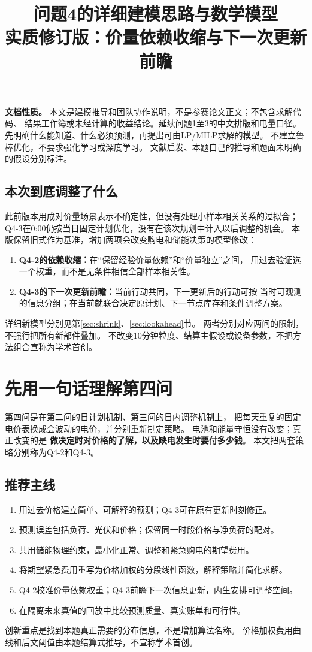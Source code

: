 \documentclass[UTF8,11pt]{ctexart}
\title{问题4的详细建模思路与数学模型\\
{\large 实质修订版：价量依赖收缩与下一次更新前瞻}}
\author{}
\date{}
\begin{document}
\maketitle

\noindent\textbf{文档性质。}
本文是建模推导和团队协作说明，不是参赛论文正文；不包含求解代码、
结果工作簿或未经计算的收益结论。延续问题1至3的中文排版和电量口径。
先明确什么能知道、什么必须预测，再提出可由LP/MILP求解的模型。
不建立鲁棒优化，不要求强化学习或深度学习。
文献启发、本题自己的推导和题面未明确的假设分别标注。

\subsection*{本次到底调整了什么}
此前版本用成对价量场景表示不确定性，但没有处理小样本相关关系的过拟合；
Q4-3在0:00仍按当日固定计划优化，没有在该次规划中计入以后调整的机会。
本版保留旧式作为基准，增加两项会改变购电和储能决策的模型修改：
\begin{enumerate}
 \item \textbf{Q4-2的依赖收缩：}在“保留经验价量依赖”和“价量独立”之间，
       用过去验证选一个权重，而不是无条件相信全部样本相关性。
 \item \textbf{Q4-3的下一次更新前瞻：}当前行动共同，下一更新后的行动可按
       当时可观测的信息分组；在当前就联合决定原计划、下一节点库存和条件调整方案。
\end{enumerate}
详细新模型分别见第\ref{sec:shrink}、\ref{sec:lookahead}节。
两者分别对应两问的限制，不强行把所有新部件叠加。
不改变10分钟粒度、结算主假设或设备参数，不把方法组合宣称为学术首创。

\section{先用一句话理解第四问}
第四问是在第二问的日计划机制、第三问的日内调整机制上，
把每天重复的固定电价表换成会波动的电价，并分别重新制定策略。
电池和能量守恒没有改变；真正改变的是
\textbf{做决定时对价格的了解，以及缺电发生时要付多少钱}。
本文把两套策略分别称为Q4-2和Q4-3。

\subsection{推荐主线}
\begin{enumerate}
 \item 用过去价格建立简单、可解释的预测；Q4-3可在原有更新时刻修正。
 \item 预测误差包括负荷、光伏和价格；保留同一时段价格与净负荷的配对。
 \item 共用储能物理约束，最小化正常、调整和紧急购电的期望费用。
 \item 将期望紧急费用重写为价格加权的分段线性函数，解释策略并简化求解。
 \item Q4-2校准价量依赖权重；Q4-3前瞻下一次信息更新，内生安排可调整空间。
 \item 在隔离未来真值的回放中比较预测质量、真实账单和可行性。
\end{enumerate}
创新重点是找到本题真正需要的分布信息，不是增加算法名称。
价格加权费用曲线和后文阈值由本题结算式推导，不宣称学术首创。
\end{document}
